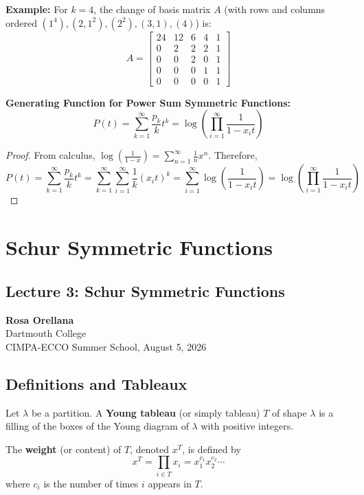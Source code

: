 \documentclass[12pt]{memoir}
\begin{document}
\textbf{Example:} For $k = 4$, the change of basis matrix $A$ (with rows and columns ordered $(1^4), (2,1^2), (2^2), (3,1), (4)$) is:
\[
A = \begin{bmatrix}
24 & 12 & 6 & 4 & 1 \\
0 & 2 & 2 & 2 & 1 \\
0 & 0 & 2 & 0 & 1 \\
0 & 0 & 0 & 1 & 1 \\
0 & 0 & 0 & 0 & 1
\end{bmatrix}
\]

\begin{ptcb}
\textbf{Generating Function for Power Sum Symmetric Functions:}
\[
P(t) = \sum_{k=1}^\infty \frac{p_k}{k} t^k = \log \left( \prod_{i=1}^\infty \frac{1}{1 - x_i t} \right)
\]
\end{ptcb}

\begin{proof}
From calculus, $\log \left( \frac{1}{1 - x} \right) = \sum_{n=1}^\infty \frac{1}{n} x^n$. Therefore,
\[
P(t) = \sum_{k=1}^\infty \frac{p_k}{k} t^k = \sum_{k=1}^\infty \sum_{i=1}^\infty \frac{1}{k} (x_i t)^k = \sum_{i=1}^\infty \log \left( \frac{1}{1 - x_i t} \right) = \log \left( \prod_{i=1}^\infty \frac{1}{1 - x_i t} \right)
\]
\end{proof}

\chapter{Schur Symmetric Functions}

\section*{Lecture 3: Schur Symmetric Functions}
\begin{center}
\textbf{Rosa Orellana} \\
Dartmouth College \\
CIMPA-ECCO Summer School, August 5, 2026
\end{center}

\section{Definitions and Tableaux}

\begin{ptcb}
\begin{Def}
Let $\lambda$ be a partition. A \textbf{Young tableau} (or simply tableau) $T$ of shape $\lambda$ is a filling of the boxes of the Young diagram of $\lambda$ with positive integers.

The \textbf{weight} (or content) of $T$, denoted $x^T$, is defined by
\[
x^T = \prod_{i \in T} x_i = x_1^{c_1} x_2^{c_2} \cdots
\]
where $c_i$ is the number of times $i$ appears in $T$.
\end{Def}
\end{ptcb}
\end{document}
